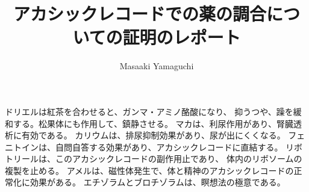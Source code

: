 \documentclass{jsarticle}
\begin{document}
\title{アカシックレコードでの薬の調合についての証明のレポート}
\author{Masaaki Yamaguchi}
\date{}
\maketitle


       ドリエルは紅茶を合わせると、ガンマ・アミノ酪酸になり、
  抑うつや、躁を緩和する。松果体にも作用して、鎮静させる。
  マカは、利尿作用があり、腎臓透析に有効である。
  カリウムは、排尿抑制効果があり、尿が出にくくなる。
  フェニトインは、自問自答する効果があり、アカシックレコードに直結する。
  リボトリールは、このアカシックレコードの副作用止であり、
  体内のリボソームの複製を止める。
  アメルは、磁性体発生で、体と精神のアカシックレコードの正常化に効果がある。
  エチゾラムとブロチゾラムは、瞑想法の極意である。
\end{document}
